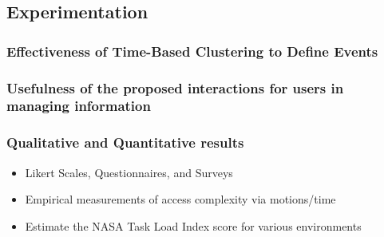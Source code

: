 \documentclass[11pt]{article}
\begin{document}
\subsection{Experimentation}
\label{sec:orgd3257e7}
\subsubsection{Effectiveness of Time-Based Clustering to Define Events}
\label{sec:org2bdb83c}
\subsubsection{Usefulness of the proposed interactions for users in managing information}
\label{sec:orgd88d29e}
\subsubsection{Qualitative and Quantitative results}
\label{sec:orga7d3f3e}
\begin{itemize}
\item Likert Scales, Questionnaires, and Surveys
\item Empirical measurements of access complexity via motions/time
\item Estimate the NASA Task Load Index score for various environments
\end{itemize}
\end{document}
